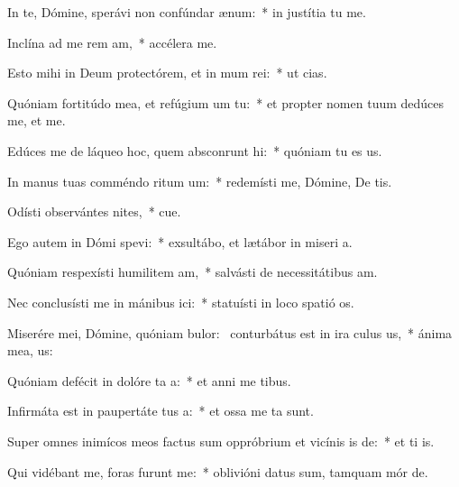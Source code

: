\item In te, Dómine, sperávi non confúndar  ænum:~* in justítia tu  me.
\item Inclína ad me rem am,~* accélera   me.
\item Esto mihi in Deum protectórem, et in mum rei:~* ut   cias.
\item Quóniam fortitúdo mea, et refúgium um  tu:~* et propter nomen tuum dedúces me, et  me.
\item Edúces me de láqueo hoc, quem absconrunt hi:~* quóniam tu es  us.
\item In manus tuas comméndo ritum um:~* redemísti me, Dómine, De tis.
\item Odísti observántes nites,~* cue.
\item Ego autem in Dómi spevi:~* exsultábo, et lætábor in miseri a.
\item Quóniam respexísti humilitem am,~* salvásti de necessitátibus  am.
\item Nec conclusísti me in mánibus ici:~* statuísti in loco spatió  os.
\item Miserére mei, Dómine, quóniam bulor:~\pscross{} conturbátus est in ira culus us,~* ánima mea,   us:
\item Quóniam defécit in dolóre ta a:~* et anni me  tibus.
\item Infirmáta est in paupertáte tus a:~* et ossa me ta sunt.
\item Super omnes inimícos meos factus sum oppróbrium et vicínis is de:~* et ti  is.
\item Qui vidébant me, foras furunt  me:~* oblivióni datus sum, tamquam mór  de.
